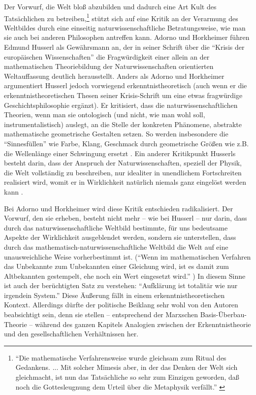 \documentclass[12pt,a4paper,ngerman]{article}
\begin{document}
Der Vorwurf, die Welt bloß abzubilden und dadurch eine Art Kult des
Tatsächlichen zu betreiben,\footnote{"`Die mathematische
  Verfahrensweise wurde gleichsam zum Ritual des Gedankens. ... Mit
  solcher Mimesis aber, in der das Denken der Welt sich gleichmacht,
  ist nun das Tatsächliche so sehr zum Einzigen geworden, daß noch die
  Gottesleugnung dem Urteil über die Metaphysik verfällt."'  \cite[S.
  31/32]{adorno-horkheimer:1947}} stützt sich auf eine Kritik an der
Verarmung des Weltbildes durch eine einseitig naturwissenschaftliche
Betratungsweise, wie man sie auch bei anderen Philosophen antreffen
kann. Adorno und Horkheimer führen Edmund Husserl als Gewährsmann an,
der in seiner Schrift über die "`Krisis der europäischen
Wissenschaften"' \cite[]{husserl:1936} die Fragwürdigkeit einer allein
an der mathematischen Theoriebildung der Naturwissenschaften
orientierten Weltauffassung deutlich herausstellt. Anders als Adorno
und Horkheimer argumentiert Husserl jedoch vorwiegend
erkenntnistheoretisch (auch wenn er die erkenntnistheoretischen Thesen
seiner Krisis-Schrift um eine etwas fragwürdige Geschichtsphilosophie
ergänzt). Er kritisiert, dass die naturwissenschaftlichen Theorien,
wenn man sie ontologisch (und nicht, wie man wohl soll,
instrumentalistisch) auslegt, an die Stelle der konkreten Phänomene,
abstrakte mathematische geometrische Gestalten setzen. So werden
insbesondere die "`Sinnesfüllen"' wie Farbe, Klang, Geschmack durch
geometrische Größen wie z.B. die Wellenlänge einer Schwingung ersetzt
\cite[§9 c)]{husserl:1936}. Ein anderer Kritikpunkt Husserls besteht
darin, dass der Anspruch der Naturwissenschaften, speziell der Physik,
die Welt vollständig zu beschreiben, nur idealiter in unendlichem
Fortschreiten realisiert wird, womit er in Wirklichkeit natürlich
niemals ganz eingelöst werden kann \cite[§9 e)]{husserl:1936}.

Bei Adorno und Horkheimer wird diese Kritik entschieden
radikalisiert. Der Vorwurf, den sie erheben, besteht nicht mehr -- wie
bei Husserl -- nur darin, dass durch das naturwissenschaftliche
Weltbild bestimmte, für uns bedeutsame Aspekte der Wirklichkeit
ausgeblendet werden, sondern sie unterstellen, dass durch das
mathematisch-naturwissenschaftliche Weltbild die Welt auf eine
unausweichliche Weise vorherbestimmt ist. ("`Wenn im mathematischen
Verfahren das Unbekannte zum Unbekannten einer Gleichung wird, ist es
damit zum Altbekannten gestempelt, ehe noch ein Wert eingesetzt
wird."' \cite[S. 31]{adorno-horkheimer:1947}) In diesem Sinne ist auch
der berüchtigten Satz zu verstehen: "`Aufklärung ist totalitär wie nur
irgendein System."' \cite[S. 31 (Vgl. auch
S.12)]{adorno-horkheimer:1947} Diese Äußerung fällt in einem
erkenntnistheoretischen Kontext. Allerdings dürfte der politische
Beiklang sehr wohl von den Autoren beabsichtigt sein, denn sie stellen
-- entsprechend der Marxschen Basis-Überbau-Theorie -- während des
ganzen Kapitels Analogien zwischen der Erkenntnistheorie und den
gesellschaftlichen Verhältnissen her.
\end{document}
